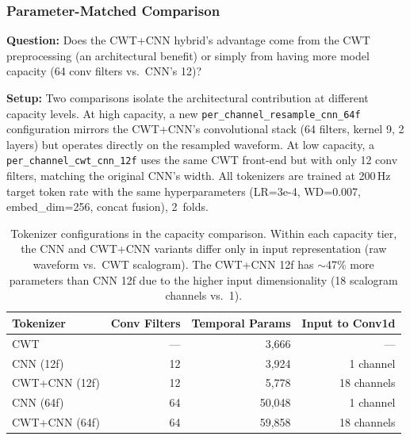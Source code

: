 \documentclass[11pt, a4paper]{article}
\begin{document}
\subsubsection{Parameter-Matched Comparison}
\label{sec:param-match}

\textbf{Question:} Does the CWT+CNN hybrid's advantage come from the
CWT preprocessing (an architectural benefit) or simply from having
more model capacity (64 conv filters vs.\ CNN's 12)?

\textbf{Setup:} Two comparisons isolate the architectural contribution
at different capacity levels. At high capacity, a new
\texttt{per\_channel\_resample\_cnn\_64f} configuration mirrors the
CWT+CNN's convolutional stack (64 filters, kernel 9, 2 layers) but
operates directly on the resampled waveform. At low capacity, a
\texttt{per\_channel\_cwt\_cnn\_12f} uses the same CWT front-end but
with only 12 conv filters, matching the original CNN's width. All
tokenizers are trained at 200\,Hz target token rate with the same
hyperparameters (LR=3e-4, WD=0.007, embed\_dim=256, concat fusion),
2~folds.

\begin{table}[H]
      \centering
      \begin{tabular}{lrrr}
            \toprule
            \textbf{Tokenizer}  & \textbf{Conv Filters} & \textbf{Temporal Params} & \textbf{Input to Conv1d} \\
            \midrule
            CWT                 & ---                   & 3{,}666                  & ---                      \\
            CNN (12f)           & 12                    & 3{,}924                  & 1 channel                \\
            CWT+CNN (12f)       & 12                    & 5{,}778                  & 18 channels              \\
            CNN (64f)           & 64                    & 50{,}048                 & 1 channel                \\
            CWT+CNN (64f)       & 64                    & 59{,}858                 & 18 channels              \\
            \bottomrule
      \end{tabular}
      \caption{Tokenizer configurations in the capacity comparison.
            Within each capacity tier, the CNN and CWT+CNN variants
            differ only in input representation (raw waveform vs.\
            CWT scalogram). The CWT+CNN 12f has $\sim$47\% more
            parameters than CNN 12f due to the higher input
            dimensionality (18 scalogram channels vs.\ 1).}
      \label{tab:param-match-configs}
\end{table}
\end{document}
